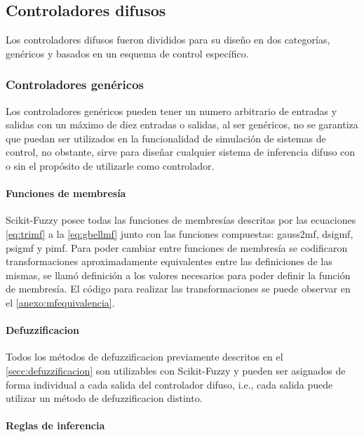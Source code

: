     \subsection{Controladores difusos}

        Los controladores difusos fueron divididos para su diseño en dos categorías, genéricos y basados en un esquema de control específico.
        
        \subsubsection{Controladores genéricos}

            Los controladores genéricos pueden tener un numero arbitrario de entradas y salidas con un máximo de diez entradas o salidas, al ser genéricos, no se garantiza que puedan ser utilizados en la funcionalidad de simulación de sistemas de control, no obstante, sirve para diseñar cualquier sistema de inferencia difuso con o sin el propósito de utilizarle como controlador.

            \paragraph{Funciones de membresía}

                Scikit-Fuzzy posee todas las funciones de membresías descritas por las ecuaciones \cref{eq:trimf} a la \cref{eq:gbellmf} junto con las funciones compuestas: gauss2mf, dsigmf, psigmf y pimf. Para poder cambiar entre funciones de membresía se codificaron transformaciones aproximadamente equivalentes entre las definiciones de las mismas, se llamó definición a los valores necesarios para poder definir la función de membresía. El código para realizar las transformaciones se puede observar en el \ref{anexo:mfequivalencia}.

            \paragraph{Defuzzificacion}

                Todos los métodos de defuzzificacion previamente descritos en el \cref{secc:defuzzificacion} son utilizables con Scikit-Fuzzy y pueden ser asignados de forma individual a cada salida del controlador difuso, i.e., cada salida puede utilizar un método de defuzzificacion distinto.

            \paragraph{Reglas de inferencia}

